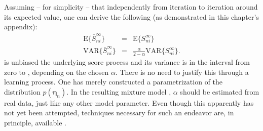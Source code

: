 Assuming -- for simplicity -- that 
independently from iteration to iteration around its expected value, one can derive the following 
(as demonstrated in this chapter's appendix):
\begin{eqnarray}
\text{E}\{\bar{S}_{ni}^{\infty}\} & = & \text{E}\{S_{ni}^{\infty}\}\\
\text{VAR}\{\bar{S}_{ni}^{\infty}\} & = & \frac{\alpha}{2-\alpha}\text{VAR}\{S_{ni}^{\infty}\}.
\end{eqnarray}
 is unbiased
 the underlying score process and  its
variance is in the interval from zero to , depending on the chosen $\alpha$.
There is no need to justify this
through a learning process. One has merely constructed a parametrization
of the distribution $p(\boldsymbol{\eta}_n)$. In the resulting
mixture model , $\alpha$ should be
estimated from real data, just like any other model parameter.
Even though this apparently has not yet been attempted, techniques
necessary for such an endeavor are, in principle, available
\citep{gourioux-1993}.
%
%




